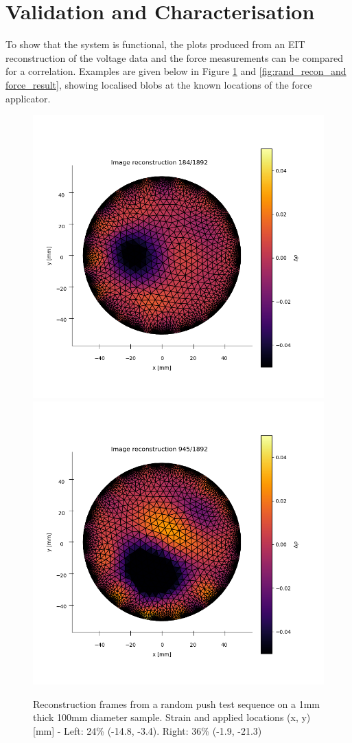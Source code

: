 \section{Validation and Characterisation}
\label{sec:Validation and characterisation}
To show that the system is functional, the plots produced from an EIT reconstruction of the voltage data and the force measurements can be compared for a correlation. Examples are given below in Figure \ref{fig:rand_recon_result} and \ref{fig:rand_recon_and force_result}, showing localised blobs at the known locations of the force applicator.
\begin{figure}[H]
\centering
\includegraphics[width=0.49\linewidth]{Figures/DEA1_CBSR_8p_9push_rand10strain_30s_1mA_1_frame184.png}
\includegraphics[width=0.49\linewidth]{Figures/DEA1_CBSR_8p_9push_rand10strain_30s_1mA_1_frame945.png}
\caption{Reconstruction frames from a random push test sequence on a 1mm thick 100mm diameter sample. Strain and applied locations (x, y) [mm] - Left: 24\% (-14.8, -3.4). Right: 36\% (-1.9, -21.3)}
\label{fig:rand_recon_result}
\end{figure}
